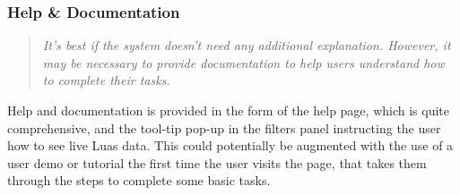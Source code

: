 \documentclass[a4paper,11pt]{report}
\begin{document}
\subsubsection{Help \& Documentation}
\begin{quote}
    \textit{ It’s best if the system doesn’t need any additional explanation. However, it may be necessary to provide documentation to help users understand how to complete their tasks. }
\end{quote}

Help and documentation is provided in the form of the help page, which is quite comprehensive, and the tool-tip pop-up in the filters panel instructing the user how to see live Luas data.
This could potentially be augmented with the use of a user demo or tutorial the first time the user visits the page, that takes them through the steps to complete some basic tasks.
\end{document}
